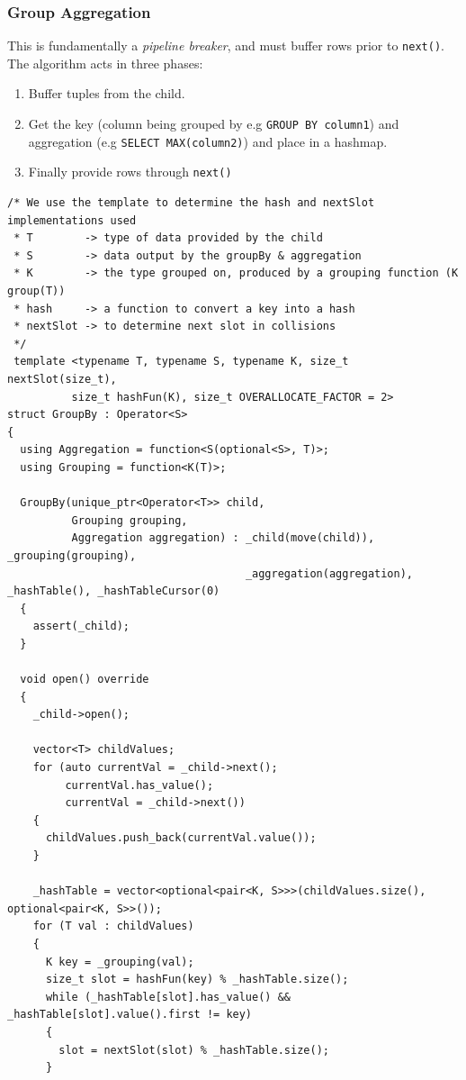 \subsubsection{Group Aggregation}
This is fundamentally a \textit{pipeline breaker}, and must buffer rows prior to \texttt{next()}. 
The algorithm acts in three phases:
\begin{enumerate}
    \item Buffer tuples from the child.
    \item Get the key (column being grouped by e.g \texttt{GROUP BY column1}) and aggregation (e.g \texttt{SELECT MAX(column2)}) and place in a hashmap.
    \item Finally provide rows through \texttt{next()}
\end{enumerate}
\begin{verbatim}
/* We use the template to determine the hash and nextSlot implementations used
 * T        -> type of data provided by the child
 * S        -> data output by the groupBy & aggregation
 * K        -> the type grouped on, produced by a grouping function (K group(T))
 * hash     -> a function to convert a key into a hash
 * nextSlot -> to determine next slot in collisions
 */
 template <typename T, typename S, typename K, size_t nextSlot(size_t),
          size_t hashFun(K), size_t OVERALLOCATE_FACTOR = 2>
struct GroupBy : Operator<S>
{
  using Aggregation = function<S(optional<S>, T)>;
  using Grouping = function<K(T)>;

  GroupBy(unique_ptr<Operator<T>> child,
          Grouping grouping,
          Aggregation aggregation) : _child(move(child)), _grouping(grouping),
                                     _aggregation(aggregation), _hashTable(), _hashTableCursor(0)
  {
    assert(_child);
  }

  void open() override
  {
    _child->open();

    vector<T> childValues;
    for (auto currentVal = _child->next();
         currentVal.has_value();
         currentVal = _child->next())
    {
      childValues.push_back(currentVal.value());
    }

    _hashTable = vector<optional<pair<K, S>>>(childValues.size(), optional<pair<K, S>>());
    for (T val : childValues)
    {
      K key = _grouping(val);
      size_t slot = hashFun(key) % _hashTable.size();
      while (_hashTable[slot].has_value() && _hashTable[slot].value().first != key)
      {
        slot = nextSlot(slot) % _hashTable.size();
      }


\end{verbatim}
